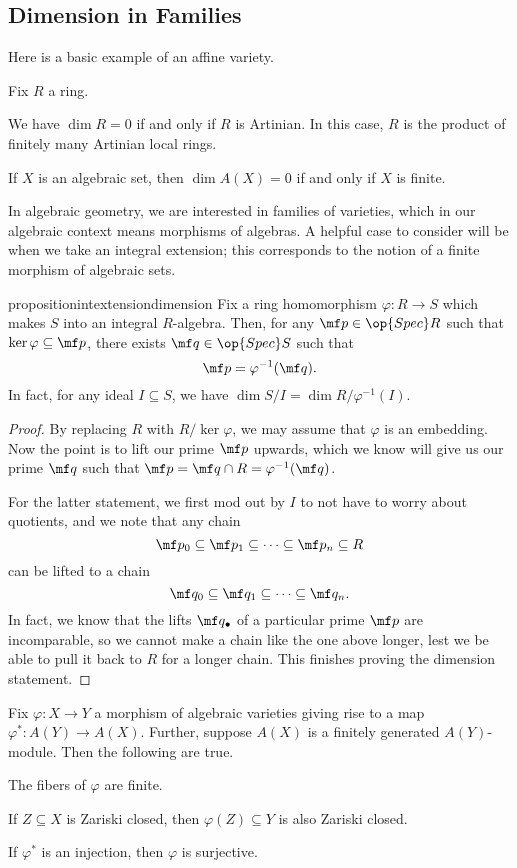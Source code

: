 \subsection{Dimension in Families}
Here is a basic example of an affine variety.
\begin{proposition}
	Fix $R$ a ring.
	\begin{listalph}
		\item We have $\dim R=0$ if and only if $R$ is Artinian. In this case, $R$ is the product of finitely many Artinian local rings.
		\item If $X$ is an algebraic set, then $\dim A(X)=0$ if and only if $X$ is finite.
	\end{listalph}
\end{proposition}
In algebraic geometry, we are interested in families of varieties, which in our algebraic context means morphisms of algebras. A helpful case to consider will be when we take an integral extension; this corresponds to the notion of a finite morphism of algebraic sets.
\begin{restatable}{proposition}{intextensiondimension}
	Fix a ring homomorphism $\varphi:R\to S$ which makes $S$ into an integral $R$-algebra. Then, for any $\mf p\in\op{Spec}R$ such that $\ker\varphi\subseteq\mf p$, there exists $\mf q\in\op{Spec}S$ such that
	\[\mf p=\varphi^{-1}(\mf q).\]
	In fact, for any ideal $I\subseteq S$, we have $\dim S/I=\dim R/\varphi^{-1}(I)$.
\end{restatable}
\begin{proof}
	By replacing $R$ with $R/\ker\varphi$, we may assume that $\varphi$ is an embedding. Now the point is to lift our prime $\mf p$ upwards, which we know will give us our prime $\mf q$ such that $\mf p=\mf q\cap R=\varphi^{-1}(\mf q)$.

	For the latter statement, we first mod out by $I$ to not have to worry about quotients, and we note that any chain
	\[\mf p_0\subseteq\mf p_1\subseteq\cdots\subseteq\mf p_n\subseteq R\]
	can be lifted to a chain
	\[\mf q_0\subseteq\mf q_1\subseteq\cdots\subseteq\mf q_n.\]
	In fact, we know that the lifts $\mf q_\bullet$ of a particular prime $\mf p$ are incomparable, so we cannot make a chain like the one above longer, lest we be able to pull it back to $R$ for a longer chain. This finishes proving the dimension statement.
\end{proof}
\begin{corollary}
	Fix $\varphi:X\to Y$ a morphism of algebraic varieties giving rise to a map $\varphi^*:A(Y)\to A(X)$. Further, suppose $A(X)$ is a finitely generated $A(Y)$-module. Then the following are true.
	\begin{listalph}
		\item The fibers of $\varphi$ are finite.
		\item If $Z\subseteq X$ is Zariski closed, then $\varphi(Z)\subseteq Y$ is also Zariski closed.
		\item If $\varphi^*$ is an injection, then $\varphi$ is surjective.
	\end{listalph}
\end{corollary}
